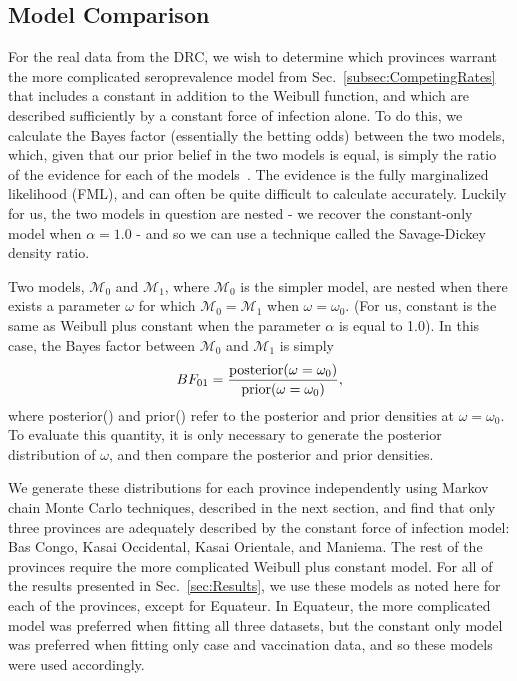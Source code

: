 \documentclass[nofootinbib,aps,pre,twocolumn,superscriptaddress,showkeys,showpacs]{revtex4-1}
\begin{document}
\subsection{Model Comparison\label{subsec:BF}}
For the real data from the DRC, we wish to determine which provinces warrant the more complicated seroprevalence model from Sec.~\ref{subsec:CompetingRates} that includes a constant in addition to the Weibull function, and which are described sufficiently by a constant force of infection alone. To do this, we calculate the Bayes factor (essentially the betting odds) between the two models, which, given that our prior belief in the two models is equal, is simply the ratio of the evidence for each of the models~\cite{TheRev}. The evidence is the fully marginalized likelihood (FML), and can often be quite difficult to calculate accurately. Luckily for us, the two models in question are nested - we recover the constant-only model when $\alpha = 1.0$ -  and so we can use a technique called the Savage-Dickey density ratio.

Two models, $\mathcal{M}_0$ and $\mathcal{M}_1$, where $\mathcal{M}_0$ is the simpler model, are nested when there exists a parameter $\omega$ for which $\mathcal{M}_0 = \mathcal{M}_1$ when $\omega = \omega_0$. (For us, constant is the same as Weibull plus constant when the parameter $\alpha$ is equal to 1.0). In this case, the Bayes factor between $\mathcal{M}_0$ and $\mathcal{M}_1$ is simply
\begin{equation}
BF_{01} = \frac{\rm{posterior}(\omega =\omega_0)}{\rm{prior}(\omega=\omega_0)},
\end{equation}
where posterior() and prior() refer to the posterior and prior densities at $\omega = \omega_0$. To evaluate this quantity, it is only necessary to generate the posterior distribution of $\omega$, and then compare the posterior and prior densities.

We generate these distributions for each province independently using Markov chain Monte Carlo techniques, described in the next section, and find that only three provinces are adequately described by the constant force of infection model:  Bas Congo, Kasai Occidental, Kasai Orientale, and Maniema. The rest of the provinces require the more complicated Weibull plus constant model. For all of the results presented in Sec.~\ref{sec:Results}, we use these models as noted here for each of the provinces, except for Equateur. In Equateur, the more complicated model was preferred when fitting all three datasets, but the constant only model was preferred when fitting only case and vaccination data, and so these models were used accordingly.
\end{document}
